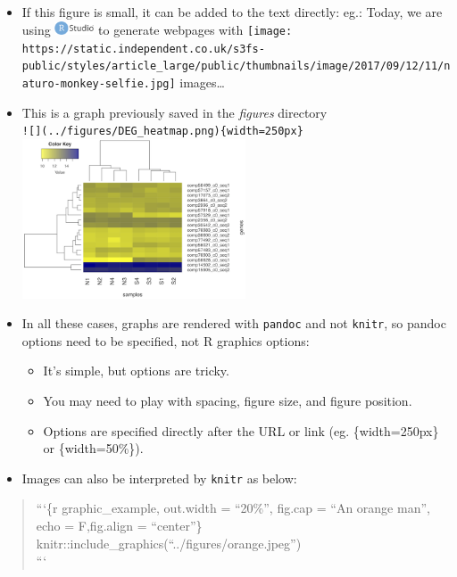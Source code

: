 \documentclass[]{article}
\begin{document}
\begin{itemize}
\item
  If this figure is small, it can be added to the text directly: eg.:
  Today, we are using
  \includegraphics[width=0.45833in,height=\textheight]{../figures/rstudio.png}
  to generate webpages with
  \texttt{[image: https://static.independent.co.uk/s3fs-public/styles/article\_large/public/thumbnails/image/2017/09/12/11/naturo-monkey-selfie.jpg]}
  images\ldots{}
\item
  This is a graph previously saved in the \emph{figures} directory\\
  \texttt{!{[}{]}(../figures/DEG\_heatmap.png)\{width=250px\}}~\\
  \includegraphics[width=2.60417in,height=\textheight]{../figures/DEG_heatmap.png}
  ~
\item
  In all these cases, graphs are rendered with \texttt{pandoc} and not
  \texttt{knitr}, so pandoc options need to be specified, not R graphics
  options:

  \begin{itemize}
  \item
    It's simple, but options are tricky.
  \item
    You may need to play with spacing, figure size, and figure position.
  \item
    Options are specified directly after the URL or link (eg.
    \{width=250px\} or \{width=50\%\}).
  \end{itemize}
\item
  Images can also be interpreted by \texttt{knitr} as below:
\end{itemize}

\begin{quote}
```\{r graphic\_example, out.width = ``20\%'', fig.cap = ``An orange
man'', echo = F,fig.align = ``center''\}\\
knitr::include\_graphics(``../figures/orange.jpeg'')\\
```
\end{quote}
\end{document}
